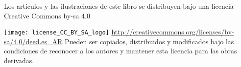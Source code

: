 
\vspace{1cm} %
\hspace{1cm}\newline %

\begin{center}
Los artículos y las ilustraciones de este libro se 
distribuyen bajo una licencia Creative Commons by-sa 4.0 
\newline

\texttt{[image: license\_CC\_BY\_SA\_logo]}
{\small 
\url{http://creativecommons.org/licenses/by-sa/4.0/deed.es_AR}
}
\newline
Pueden ser copiados, distribuidos y modificados bajo las condiciones 
de reconocer a los autores y mantener esta licencia para las obras derivadas.
\end{center}
